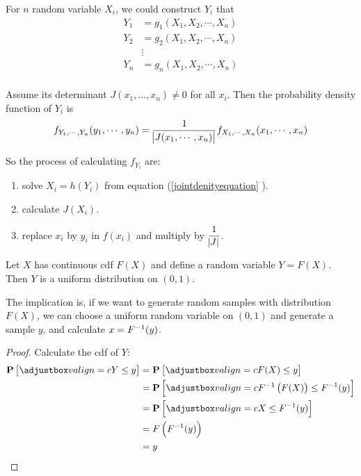 For $n$ random variable $X_i$, we could construct $Y_i$ that
\begin{equation}\label{jointdenityequation}
    \begin{aligned}
        Y_1 &= g_1 (X_1, X_2, \cdots, X_n) \\
        Y_2 &= g_2 (X_1, X_2, \cdots, X_n) \\
        & \vdots \\
        Y_n &= g_n (X_1, X_2, \cdots, X_n) \\
    \end{aligned}
\end{equation}

Assume its  determinant $J(x_1, \dots, x_n) \neq 0$ for all $x_i$. Then the probability density function of $Y_i$ is 
\begin{equation}
    f_{Y_1, \cdots, Y_n}(y_1, \cdots, y_n) = \frac{1}{\abs{J(x_1, \cdots, x_n)}} f_{X_1, \cdots, X_n}(x_1, \cdots , x_n)
\end{equation}

So the process of calculating $f_{Y_i}$ are:
\begin{enumerate}
    \item solve $X_i = h(Y_i)$ from equation (\ref{jointdenityequation} ).
    \item calculate $J(X_i)$.
    \item replace $x_i$ by $y_i$ in $f(x_i)$ and multiply by $\displaystyle \frac{1}{\abs{J}}$.
\end{enumerate}

\begin{theorem}
    Let $X$ has continuous cdf $F(X)$ and define a random variable $Y = F(X)$. Then $Y$ is a uniform distribution on $(0,1)$.
    
    The implication is, if we want to generate random samples with distribution $F(X)$, we can choose a uniform random variable on $(0,1)$ and generate a sample $y$, and calculate $x = {F}^{-1}(y)$.
\end{theorem}
\begin{proof}
    Calculate the cdf of $Y$:
    \begin{equation}
        \begin{aligned}
            \probability{Y \leq y} &= \probability{F(X) \leq y} \\
            &= \probability{ \inverse{F} \left(F(X)\right) \leq \inverse{F} (y) }\\
            &= \probability{X \leq \inverse{F} (y) } \\
            &= F\left(\inverse{F} (y) \right) \\
            &= y
        \end{aligned}
    \end{equation}
\end{proof}



